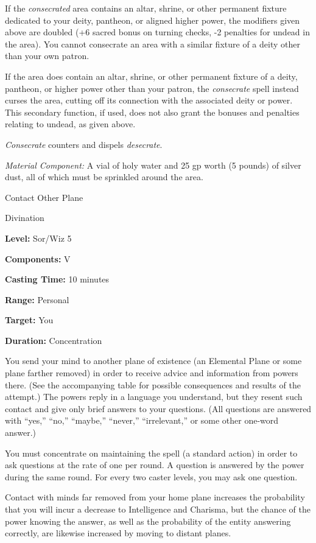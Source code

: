 \documentclass{article}
\begin{document}
If the \textit{consecrated }area contains an altar, shrine, or other permanent 
fixture dedicated to your deity, pantheon, or aligned higher power, the modifiers 
given above are doubled (+6 sacred bonus on turning checks, -2 penalties for undead 
in the area). You cannot consecrate an area with a similar fixture of a deity other 
than your own patron.

If the area does contain an altar, shrine, or other permanent fixture of a deity, 
pantheon, or higher power other than your patron, the \textit{consecrate }spell 
instead curses the area, cutting off its connection with the associated deity or 
power. This secondary function, if used, does not also grant the bonuses and penalties 
relating to undead, as given above.

\textit{Consecrate }counters and dispels \textit{desecrate}.

\textit{Material Component: }A vial of holy water and 25 gp worth (5 pounds) of 
silver dust, all of which must be sprinkled around the area.

\vspace{12pt}
Contact Other Plane

Divination

\textbf{Level:} Sor/Wiz 5

\textbf{Components:} V

\textbf{Casting Time:} 10 minutes

\textbf{Range:} Personal

\textbf{Target:} You

\textbf{Duration:} Concentration

You send your mind to another plane of existence (an Elemental Plane or some plane 
farther removed) in order to receive advice and information from powers there. 
(See the accompanying table for possible consequences and results of the attempt.) 
The powers reply in a language you understand, but they resent such contact and 
give only brief answers to your questions. (All questions are answered with ``yes,'' 
``no,'' ``maybe,'' ``never,'' ``irrelevant,'' or some other one-word answer.)

You must concentrate on maintaining the spell (a standard action) in order to ask 
questions at the rate of one per round. A question is answered by the power during 
the same round. For every two caster levels, you may ask one question.

Contact with minds far removed from your home plane increases the probability that 
you will incur a decrease to Intelligence and Charisma, but the chance of the power 
knowing the answer, as well as the probability of the entity answering correctly, 
are likewise increased by moving to distant planes.
\end{document}
